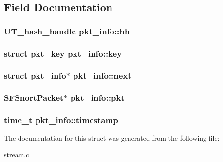 \subsection{Field Documentation}
\hypertarget{structpkt__info_a264e90d4b5d490de040f38c1072e142f}{
\subsubsection[{hh}]{\setlength{\rightskip}{0pt plus 5cm}UT\_\-hash\_\-handle {\bf pkt\_\-info::hh}}}
\label{structpkt__info_a264e90d4b5d490de040f38c1072e142f}
\hypertarget{structpkt__info_a231d4734d3c62292b06eb9ea4b49c339}{
\subsubsection[{key}]{\setlength{\rightskip}{0pt plus 5cm}struct {\bf pkt\_\-key} {\bf pkt\_\-info::key}}}
\label{structpkt__info_a231d4734d3c62292b06eb9ea4b49c339}
\hypertarget{structpkt__info_a5ee3c51f2ca5768b94819182641ef168}{
\subsubsection[{next}]{\setlength{\rightskip}{0pt plus 5cm}struct {\bf pkt\_\-info}$\ast$ {\bf pkt\_\-info::next}}}
\label{structpkt__info_a5ee3c51f2ca5768b94819182641ef168}
\hypertarget{structpkt__info_a8d5ebd04a32067b05387e5c5056fe168}{
\subsubsection[{pkt}]{\setlength{\rightskip}{0pt plus 5cm}SFSnortPacket$\ast$ {\bf pkt\_\-info::pkt}}}
\label{structpkt__info_a8d5ebd04a32067b05387e5c5056fe168}
\hypertarget{structpkt__info_a7f5090443f21e6290f0439f1bb872e92}{
\subsubsection[{timestamp}]{\setlength{\rightskip}{0pt plus 5cm}time\_\-t {\bf pkt\_\-info::timestamp}}}
\label{structpkt__info_a7f5090443f21e6290f0439f1bb872e92}


The documentation for this struct was generated from the following file:\begin{DoxyCompactItemize}
\item 
\hyperlink{stream_8c}{stream.c}\end{DoxyCompactItemize}
